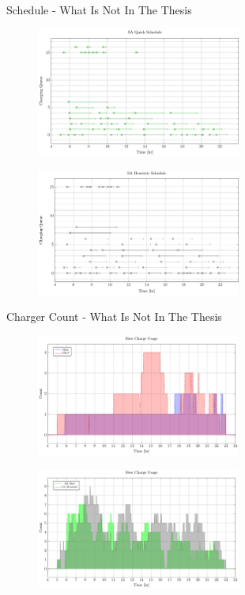 \documentclass[bigger]{beamer}
\begin{document}
\begin{frame}[label={sec:org748884b}]{Schedule - What Is Not In The Thesis}
\begin{figure}[htpb]
\centering
    \includegraphics[width=0.6\textwidth]{img/sa-pap-paper-good/schedule-sa-quick}
\end{figure}
\begin{figure}[htpb]
\centering
    \includegraphics[width=0.6\textwidth]{img/sa-pap-paper-good/schedule-sa-heuristic}
\end{figure}
\end{frame}

\begin{frame}[label={sec:org96db186}]{Charger Count - What Is Not In The Thesis}
\begin{figure}[htpb]
\centering
    \includegraphics[width=0.6\textwidth]{img/sa-pap-paper-good/charger-count-slow-milp-qin}
\end{figure}
\begin{figure}[htpb]
\centering
    \includegraphics[width=0.6\textwidth]{img/sa-pap-paper-good/charger-count-slow-sa}
\end{figure}
\end{frame}
\end{document}
